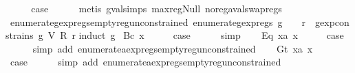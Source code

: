 \begin{isabellebody}
\ \ \isamarkupfalse%
\ \isamarkupfalse%
\ {\isacharquery}case\isanewline
\ \ \ \ \isamarkupfalse%
\ {\isacharparenleft}metis\ gval{\isachardot}simps{\isacharparenleft}{}{\isacharparenright}\ max{\isacharunderscore}reg{\isacharunderscore}Null\ no{\isacharunderscore}reg{\isacharunderscore}aval{\isacharunderscore}swap{\isacharunderscore}regs{\isacharparenright}\isanewline
{}\isamarkupfalse%
%
\endisatagproof
{\isafoldproof}%
%
\isadelimproof
\isanewline
%
\endisadelimproof
\isanewline
{}\isamarkupfalse%
\ enumerate{\isacharunderscore}gexp{\isacharunderscore}regs{\isacharunderscore}empty{\isacharunderscore}reg{\isacharunderscore}unconstrained{\isacharcolon}\ {\isachardoublequoteopen}enumerate{\isacharunderscore}gexp{\isacharunderscore}regs\ g\ {\isacharequal}\ {\isacharbraceleft}{\isacharbraceright}\ {\isasymLongrightarrow}\ {\isasymforall}r{\isachardot}\ {\isasymnot}\ gexp{\isacharunderscore}constrains\ g\ {\isacharparenleft}V\ {\isacharparenleft}R\ r{\isacharparenright}{\isacharparenright}{\isachardoublequoteclose}\isanewline
%
\isadelimproof
%
\endisadelimproof
%
\isatagproof
{}\isamarkupfalse%
{\isacharparenleft}induct\ g{\isacharparenright}\isanewline
{}\isamarkupfalse%
\ {\isacharparenleft}Bc\ x{\isacharparenright}\isanewline
\ \ \isamarkupfalse%
\ \isamarkupfalse%
\ {\isacharquery}case\isanewline
\ \ \ \ \isamarkupfalse%
\ simp\isanewline
{}\isamarkupfalse%
\isanewline
\ \ \isamarkupfalse%
\ {\isacharparenleft}Eq\ x{}a\ x{}{\isacharparenright}\isanewline
\ \ \isamarkupfalse%
\ \isamarkupfalse%
\ {\isacharquery}case\isanewline
\ \ \ \ \isamarkupfalse%
\ {\isacharparenleft}simp\ add{\isacharcolon}\ enumerate{\isacharunderscore}aexp{\isacharunderscore}regs{\isacharunderscore}empty{\isacharunderscore}reg{\isacharunderscore}unconstrained{\isacharparenright}\isanewline
{}\isamarkupfalse%
\isanewline
\ \ \isamarkupfalse%
\ {\isacharparenleft}Gt\ x{}a\ x{}{\isacharparenright}\isanewline
\ \ \isamarkupfalse%
\ \isamarkupfalse%
\ {\isacharquery}case\isanewline
\ \ \ \ \isamarkupfalse%
\ {\isacharparenleft}simp\ add{\isacharcolon}\ enumerate{\isacharunderscore}aexp{\isacharunderscore}regs{\isacharunderscore}empty{\isacharunderscore}reg{\isacharunderscore}unconstrained{\isacharparenright}\isanewline

\end{isabellebody}
